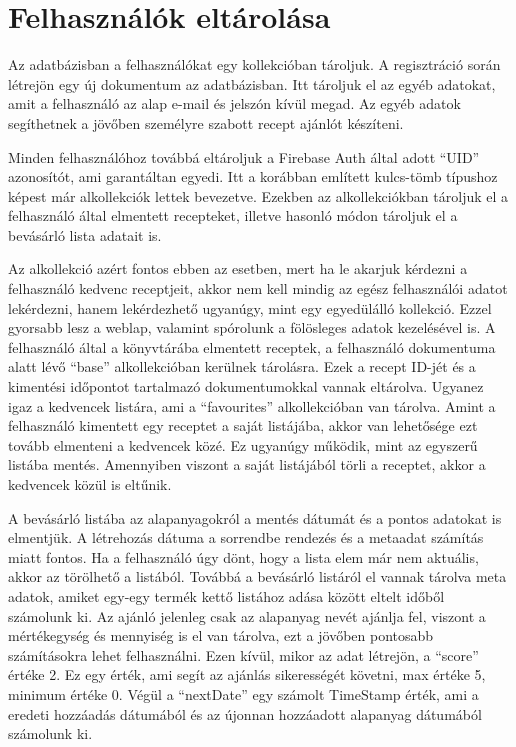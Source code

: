 \documentclass[12pt]{report}
\theoremstyle{definition}
\begin{document}
\section{Felhasználók eltárolása}
\label{dataSchemes:users}
Az adatbázisban a felhasználókat egy kollekcióban tároljuk. A regisztráció során létrejön egy új dokumentum az adatbázisban. Itt tároljuk el az egyéb adatokat, amit a felhasználó az alap e-mail és jelszón kívül megad. Az egyéb adatok segíthetnek a jövőben személyre szabott recept ajánlót készíteni. 

Minden felhasználóhoz továbbá eltároljuk a Firebase Auth által adott “UID” azonosítót, ami garantáltan egyedi. Itt a korábban említett kulcs-tömb típushoz képest már alkollekciók lettek bevezetve. Ezekben az alkollekciókban tároljuk el a felhasználó által elmentett recepteket, illetve hasonló módon tároljuk el a bevásárló lista adatait is.

Az alkollekció azért fontos ebben az esetben, mert ha le akarjuk kérdezni a felhasználó kedvenc receptjeit, akkor nem kell mindig az egész felhasználói adatot lekérdezni, hanem lekérdezhető ugyanúgy, mint egy egyedülálló kollekció. Ezzel gyorsabb lesz a weblap, valamint spórolunk a fölösleges adatok kezelésével is. A felhasználó által a könyvtárába elmentett receptek, a felhasználó dokumentuma alatt lévő “base” alkollekcióban kerülnek tárolásra. Ezek a recept ID-jét és a kimentési időpontot tartalmazó dokumentumokkal vannak eltárolva. Ugyanez igaz a kedvencek listára, ami a  “favourites” alkollekcióban van tárolva. Amint a felhasználó kimentett egy receptet a saját listájába, akkor van lehetősége ezt tovább elmenteni a kedvencek közé. Ez ugyanúgy működik, mint az egyszerű listába mentés. Amennyiben viszont a saját listájából törli a receptet, akkor a kedvencek közül is eltűnik. 

A bevásárló listába az alapanyagokról a mentés dátumát és a pontos adatokat is elmentjük. A létrehozás dátuma a sorrendbe rendezés és a metaadat számítás miatt fontos. Ha a felhasználó úgy dönt, hogy a lista elem már nem aktuális, akkor az törölhető a listából. Továbbá a bevásárló listáról el vannak tárolva meta adatok, amiket egy-egy termék kettő listához adása között eltelt időből számolunk ki. Az ajánló jelenleg csak az alapanyag nevét ajánlja fel, viszont a mértékegység és mennyiség is el van tárolva, ezt a jövőben pontosabb számításokra lehet felhasználni. Ezen kívül, mikor az adat létrejön, a “score” értéke 2. Ez egy érték, ami segít az ajánlás sikerességét követni, max értéke 5, minimum értéke 0. Végül a “nextDate” egy számolt TimeStamp érték, ami a eredeti hozzáadás dátumából és az újonnan hozzáadott alapanyag dátumából számolunk ki.
\end{document}
